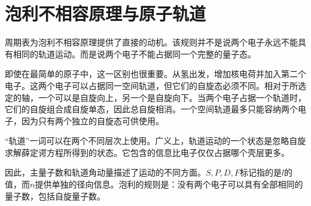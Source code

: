 \begin{classroomqa}
\end{classroomqa}

\section{泡利不相容原理与原子轨道}

周期表为泡利不相容原理提供了直接的动机。该规则并不是说两个电子永远不能具有相同的轨道运动。而是说两个电子不能占据同一个完整的量子态。

即使在最简单的原子中，这一区别也很重要。从氢出发，增加核电荷并加入第二个电子。这两个电子可以占据同一空间轨道，但它们的自旋态必须不同。相对于所选定的轴，一个可以是自旋向上，另一个是自旋向下。当两个电子占据一个轨道时，它们的自旋组合成自旋单态，因此总自旋相消。一个空间轨道最多只能容纳两个电子，因为只有两个独立的自旋态可供使用。

\begin{classroomqa}
\end{classroomqa}

``轨道''一词可以在两个不同层次上使用。广义上，轨道运动的一个状态是忽略自旋求解薛定谔方程所得到的状态。它包含的信息比电子仅仅占据哪个壳层更多。

\begin{classroomqa}
\end{classroomqa}

因此，主量子数和轨道角动量描述了运动的不同方面。\(S,P,D,F\)标记指的是\(l\)的值，而\(n\)提供单独的径向信息。泡利的规则是：没有两个电子可以具有全部相同的量子数，包括自旋量子数。

\begin{classroomqa}
\end{classroomqa}

